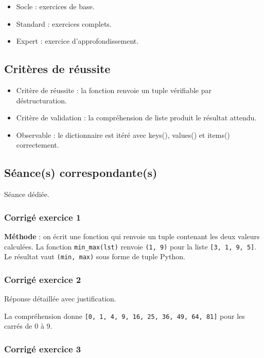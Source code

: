 \begin{itemize}
\tightlist
\item
  Socle : exercices de base.
\item
  Standard : exercices complets.
\item
  Expert : exercice d'approfondissement.
\end{itemize}

\subsection{Critères de réussite}

\begin{itemize}
\tightlist
\item
  Critère de réussite : la fonction renvoie un tuple vérifiable par
  déstructuration.
\item
  Critère de validation : la compréhension de liste produit le résultat
  attendu.
\item
  Observable : le dictionnaire est itéré avec keys(), values() et
  items() correctement.
\end{itemize}

\subsection{Séance(s) correspondante(s)}

Séance dédiée.

\subsubsection{Corrigé exercice 1}

\textbf{Méthode} : on écrit une fonction qui renvoie un tuple contenant
les deux valeurs calculées. La fonction \texttt{min\_max(lst)} renvoie
\texttt{(1,\ 9)} pour la liste \texttt{{[}3,\ 1,\ 9,\ 5{]}}. Le résultat
vaut \texttt{(min,\ max)} sous forme de tuple Python.

\subsubsection{Corrigé exercice 2}

Réponse détaillée avec justification.

La compréhension donne
\texttt{{[}0,\ 1,\ 4,\ 9,\ 16,\ 25,\ 36,\ 49,\ 64,\ 81{]}} pour les
carrés de 0 à 9.

\subsubsection{Corrigé exercice 3}

